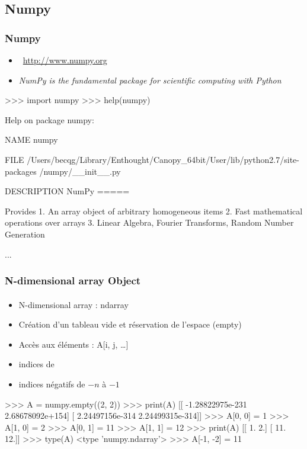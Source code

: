 \subsection{Numpy}
\begin{frame}[fragile]
\frametitle{Numpy}
\begin{itemize}
 \item {} \, \url{http://www.numpy.org}
 \item \emph{NumPy is the fundamental package for scientific computing with Python}
\end{itemize}
\begin{pythonConsole}
>>> import numpy
>>> help(numpy)

Help on package numpy:

NAME
    numpy

FILE
    /Users/becqg/Library/Enthought/Canopy_64bit/User/lib/python2.7/site-packages
    /numpy/__init__.py

DESCRIPTION
    NumPy
    =====
    
    Provides
      1. An array object of arbitrary homogeneous items
      2. Fast mathematical operations over arrays
      3. Linear Algebra, Fourier Transforms, Random Number Generation
    
...
\end{pythonConsole}
\end{frame}
\begin{frame}[fragile]
\frametitle{N-dimensional array Object}
\framesubtitle{}
\begin{itemize}
 \item N-dimensional array : ndarray
 \item Création d'un tableau vide et réservation de l'espace (empty)
 \item Accès aux éléments : A[i, j, \dots] 
 \item indices de {\color{red}{0 à $n-1$}}
 \item indices négatifs de $-n$ à $-1$
\end{itemize}
\begin{pythonConsole}

>>> A = numpy.empty((2, 2))
>>> print(A)
[[ -1.28822975e-231   2.68678092e+154]
 [  2.24497156e-314   2.24499315e-314]]
>>> A[0, 0] = 1
>>> A[1, 0] = 2
>>> A[0, 1] = 11
>>> A[1, 1] = 12
>>> print(A)
[[  1.   2.]
 [ 11.  12.]]
>>> type(A)
<type 'numpy.ndarray'>
>>> A[-1, -2] = 11
\end{pythonConsole}
\end{frame}
